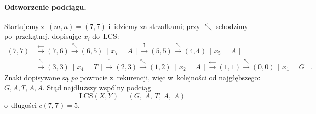 \paragraph{Odtworzenie podciągu.}
Startujemy z~$(m, n) = (7, 7)$ i~idziemy za strzałkami; przy $\nwarrow$ schodzimy
po~przekątnej, dopisując $x_i$ do~LCS:
\[
	\begin{aligned}
		(7, 7) & \xrightarrow{\leftarrow} (7, 6) \xrightarrow{\nwarrow} (6, 5) \;[\,x_7 = A\,]
		\xrightarrow{\uparrow} (5, 5) \xrightarrow{\nwarrow} (4, 4) \;[\,x_5 = A\,] \\
		       & \xrightarrow{\nwarrow} (3, 3) \;[\,x_4 = T\,]
		\xrightarrow{\uparrow} (2, 3) \xrightarrow{\nwarrow} (1, 2) \;[\,x_2 = A\,]
		\xrightarrow{\leftarrow} (1, 1) \xrightarrow{\nwarrow} (0, 0) \;[\,x_1 = G\,].
	\end{aligned}
\]
Znaki dopisywane są \emph{po} powrocie z~rekurencji, więc w~kolejności od
najgłębszego: $G, A, T, A, A$. Stąd najdłuższy wspólny podciąg
\[
	\boxed{\text{LCS}(X, Y) = (G,\ A,\ T,\ A,\ A)}
\]
o~długości $c(7, 7) = 5$.
